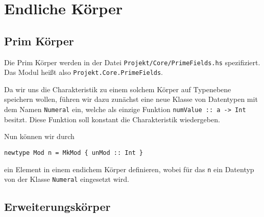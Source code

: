 \section{Endliche Körper}
\subsection{Prim Körper}
Die Prim Körper werden in der Datei \texttt{Projekt/Core/PrimeFields.hs}
spezifiziert. Das Modul heißt also \texttt{Projekt.Core.PrimeFields}.

Da wir uns die Charakteristik zu einem solchem Körper auf Typenebene speichern
wollen, führen wir dazu zunächst eine neue Klasse von Datentypen mit dem Namen
\lstinline!Numeral! ein, welche als einzige Funktion 
\lstinline!numValue :: a -> Int! besitzt. Diese Funktion soll konstant 
die Charakteristik wiedergeben.

Nun können wir durch
\begin{lstlisting}
newtype Mod n = MkMod { unMod :: Int }
\end{lstlisting}
ein Element in einem endichem Körper definieren, wobei für das \texttt{n} ein
Datentyp von der Klasse \texttt{Numeral} eingesetzt wird.


\subsection{Erweiterungskörper}

